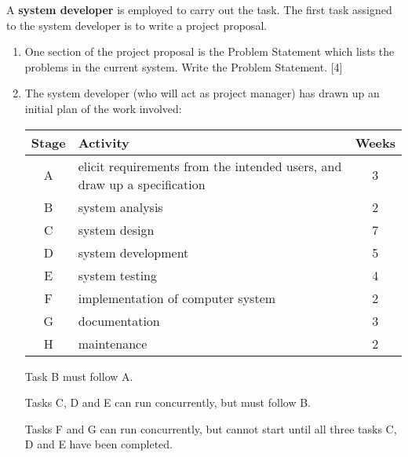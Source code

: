 A \textbf{system developer} is employed to carry out the task. The
first task assigned to the system developer is to write a project
proposal. 
\begin{enumerate}
\item One section of the project proposal is the Problem Statement which
lists the problems in the current system. Write the Problem Statement.
\hfill{}{[}4{]}
\item The system developer (who will act as project manager) has drawn up
an initial plan of the work involved: 
\noindent \begin{center}
\begin{tabular}{|c|l|c|}
\hline 
Stage & Activity & Weeks\tabularnewline
\hline 
A & elicit requirements from the intended users, and draw up a specification & 3\tabularnewline
\hline 
B & system analysis & 2\tabularnewline
\hline 
C & system design & 7\tabularnewline
\hline 
D & system development & 5\tabularnewline
\hline 
E & system testing & 4\tabularnewline
\hline 
F & implementation of computer system & 2\tabularnewline
\hline 
G & documentation & 3\tabularnewline
\hline 
H & maintenance & 2\tabularnewline
\hline 
\end{tabular}
\par\end{center}

Task B must follow A. 

Tasks C, D and E can run concurrently, but must follow B. 

Tasks F and G can run concurrently, but cannot start until all three
tasks C, D and E have been completed. 


\end{enumerate}
